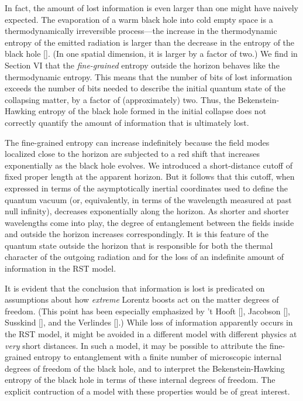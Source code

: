 In fact, the amount of lost information is even larger than one might have
naively expected.  The evaporation of a warm black hole into cold empty space
is a thermodynamically irreversible process---the increase in the thermodynamic
entropy of the emitted radiation is larger than the decrease in the entropy of
the black hole [\cite{zurek,page}].  (In one spatial dimension, it is larger by
a factor of two.)  We find in Section VI that the {\it fine-grained} entropy
outside the
horizon behaves like the thermodynamic entropy.  This means that the number of
bits of lost information exceeds the number of bits needed to describe the
initial quantum state of the collapsing matter, by a factor of
(approximately) two.  Thus, the
Bekenstein-Hawking entropy of the black hole formed in the initial collapse
does not correctly quantify the amount of information that is ultimately lost.

The fine-grained entropy can increase indefinitely because the field modes
localized close to the horizon are subjected to a red shift that increases
exponentially as the black hole evolves.  We introduced a short-distance cutoff
of fixed proper length at the apparent horizon.  But it follows that this
cutoff, when expressed in terms of the
asymptotically inertial coordinates used to
define the quantum vacuum (or, equivalently, in terms of the wavelength
measured at past null infinity), decreases exponentially
along the horizon.  As shorter and shorter wavelengths
come into play, the degree of entanglement between the fields inside and
outside the horizon increases correspondingly.  It is this feature of the
quantum state outside the horizon that is responsible for both the thermal
character of the outgoing radiation and for the loss of an indefinite amount of
information in the RST model.

It is evident that the conclusion that information is lost is predicated on
assumptions about how {\it extreme} Lorentz boosts act on the matter degrees of
freedom.  (This point has been especially emphasized by 't Hooft
[\cite{hooft}], Jacobson [\cite{jacobson}], Susskind [\cite{susskind}], and the
Verlindes [\cite{verl}].)  While loss of information apparently occurs in the
RST model, it might be avoided in a different model with different physics at
{\it very} short distances.  In such a model, it may be possible to
attribute the fine-grained entropy to entanglement with a finite number of
microscopic internal degrees of freedom of the black hole, and to interpret the
Bekenstein-Hawking entropy of the black hole in terms of these internal degrees
of freedom.  The explicit contruction of a model with these properties would be
of great interest.

